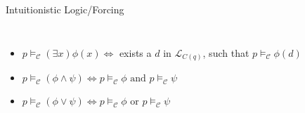 \documentclass{beamer}
\begin{document}
\begin{frame}{Intuitionistic Logic/Forcing}
\begin{columns}
{\begin{itemize}
\item    \textcolor{black!30}{$ p \vDash_{\mathcal{C}} (\exists x) \phi(x)  \Leftrightarrow $  exists a $d$ in  $\mathcal{L}_{C(q)}$, such that $p \vDash_{\mathcal{C}} \phi(d)$}\\

\item    \textcolor{black!30}{$ p \vDash_{\mathcal{C}} (\phi \land \psi)    \Leftrightarrow p \vDash_{\mathcal{C}} \phi \text{ and } p \vDash_{\mathcal{C}} \psi$}\\

\item    \textcolor{black!30}{$ p \vDash_{\mathcal{C}} (\phi \lor \psi)     \Leftrightarrow p \vDash_{\mathcal{C}} \phi$ or $p \vDash_{\mathcal{C}} \psi$}\\


    \end{itemize}
}

    \rule{0.2mm}{\textheight} %

    \forcingExampleiII
    

\end{columns}
\end{frame}
\end{document}
